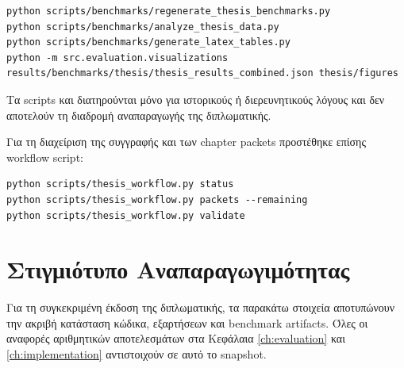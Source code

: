 \begin{lstlisting}
python scripts/benchmarks/regenerate_thesis_benchmarks.py
python scripts/benchmarks/analyze_thesis_data.py
python scripts/benchmarks/generate_latex_tables.py
python -m src.evaluation.visualizations results/benchmarks/thesis/thesis_results_combined.json thesis/figures
\end{lstlisting}

Τα scripts  και
 διατηρούνται μόνο για ιστορικούς ή
διερευνητικούς λόγους και δεν αποτελούν τη διαδρομή αναπαραγωγής της
διπλωματικής.

Για τη διαχείριση της συγγραφής και των chapter packets προστέθηκε επίσης workflow script:

\begin{lstlisting}
python scripts/thesis_workflow.py status
python scripts/thesis_workflow.py packets --remaining
python scripts/thesis_workflow.py validate
\end{lstlisting}

\section{Στιγμιότυπο Αναπαραγωγιμότητας}
\label{sec:reproducibility_snapshot}

Για τη συγκεκριμένη έκδοση της διπλωματικής, τα παρακάτω στοιχεία αποτυπώνουν την ακριβή κατάσταση κώδικα, εξαρτήσεων και benchmark artifacts. Όλες οι αναφορές αριθμητικών αποτελεσμάτων στα Κεφάλαια \ref{ch:evaluation} και \ref{ch:implementation} αντιστοιχούν σε αυτό το snapshot.

